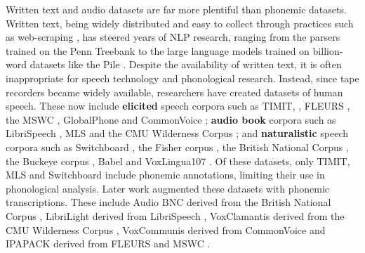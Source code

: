 Written text and audio datasets are far more plentiful than phonemic datasets. Written text, being widely distributed and easy to collect through practices such as web-scraping \citep{bansal-2022-datascaling}, has steered years of NLP research, ranging from the parsers trained on the Penn Treebank \citep{taylor2003penn} to the large language models trained on billion-word datasets like the Pile \citep{pile}. Despite the availability of written text, it is often inappropriate for speech technology and phonological research. Instead, since tape recorders became widely available, researchers have created datasets of human speech. These now include \textbf{elicited} speech corpora such as TIMIT, \citep{garofolo1993darpa}, FLEURS \citep{conneau2023fleurs}, the MSWC \citep{mazumder2021multilingual}, GlobalPhone \citep{schultz2002globalphone} and CommonVoice \citep{ardila-etal-2020-common}; \textbf{audio book} corpora such as LibriSpeech \citep{panayotov2015librispeech}, MLS \citep{pratap2020mls} and the CMU Wilderness Corpus \citep{8683536}; and \textbf{naturalistic} speech corpora such as Switchboard \citep{godfrey1992switchboard}, the Fisher corpus \citep{cieri2004fisher}, the British National Corpus \citep{bnc2007}, the Buckeye corpus \citep{pitt2007buckeye}, Babel \citep{harper2011babel} and VoxLingua107 \citep{9383459}. Of these datasets, only TIMIT, MLS and Switchboard include phonemic annotations, limiting their use in phonological analysis. Later work augmented these datasets with phonemic transcriptions. These include Audio BNC derived from the British National Corpus \citep{coleman2011mining}, LibriLight derived from LibriSpeech \citep{Kahn_2020}, VoxClamantis derived from the CMU Wilderness Corpus \citep{salesky-etal-2020-corpus}, VoxCommunis derived from CommonVoice \citep{ahn-chodroff-2022-voxcommunis} and IPAPACK derived from FLEURS and MSWC \citep{zhu-etal-2024-taste}.


